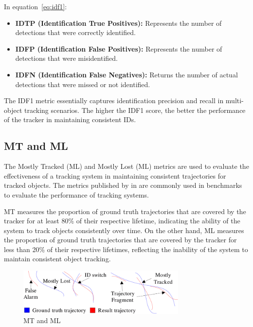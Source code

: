 In equation~\ref{eq:idf1}:

\begin{itemize}
    \item \textbf{IDTP (Identification True Positives):} Represents the number of detections that were correctly identified.
    \item \textbf{IDFP (Identification False Positives):} Represents the number of detections that were misidentified.
    \item \textbf{IDFN (Identification False Negatives):} Returns the number of actual detections that were missed or not identified.
\end{itemize}

The IDF1 metric essentially captures identification precision and recall in multi-object tracking scenarios. The higher the IDF1 score, the better the performance of the tracker in maintaining consistent IDs.

\subsection{MT and ML}\label{subsec:mt_ml}
The Mostly Tracked (ML) and Mostly Lost (ML) metrics are used to evaluate the effectiveness of a tracking system in maintaining consistent trajectories for tracked objects. The metrics published by \textcite{Wu06} in \citeyear{Wu06} are commonly used in benchmarks to evaluate the performance of tracking systems.

MT measures the proportion of ground truth trajectories that are covered by the tracker for at least 80\% of their respective lifetime, indicating the ability of the system to track objects consistently over time. On the other hand, ML measures the proportion of ground truth trajectories that are covered by the tracker for less than 20\% of their respective lifetimes, reflecting the inability of the system to maintain consistent object tracking.

\begin{figure}[ht]
    \centering
    \includegraphics[width=0.75\textwidth]{resources/fig/Wu06-MT_ML.png}
    \caption{MT and ML~\cite[Fig.~5]{Wu06}}\label{fig:mt_ml}
\end{figure}

